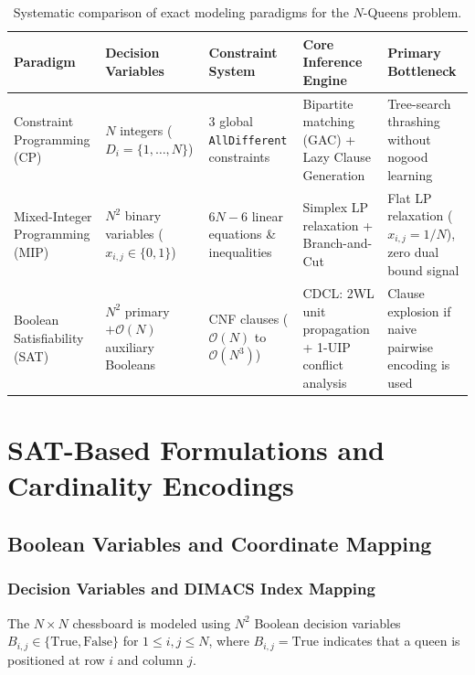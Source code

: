 \documentclass[a4paper,fleqn]{cas-sc}
\begin{document}
\begin{table}[ht]
\centering
\caption{Systematic comparison of exact modeling paradigms for the $N$-Queens problem.}
\label{tab:paradigm_comparison}
\begin{tabularx}{\linewidth}{lXXXX}
\toprule
\textbf{Paradigm} & \textbf{Decision Variables} & \textbf{Constraint System} & \textbf{Core Inference Engine} & \textbf{Primary Bottleneck} \\
\midrule
Constraint Programming (CP) & $N$ integers ($D_i = \{1, \dots, N\}$) & 3 global \texttt{AllDifferent} constraints & Bipartite matching (GAC) + Lazy Clause Generation & Tree-search thrashing without nogood learning \\
Mixed-Integer Programming (MIP) & $N^2$ binary variables ($x_{i,j} \in \{0, 1\}$) & $6N - 6$ linear equations \& inequalities & Simplex LP relaxation + Branch-and-Cut & Flat LP relaxation ($x_{i,j} = 1/N$), zero dual bound signal \\
Boolean Satisfiability (SAT) & $N^2$ primary $+ \mathcal{O}(N)$ auxiliary Booleans & CNF clauses ($\mathcal{O}(N)$ to $\mathcal{O}(N^3)$) & CDCL: 2WL unit propagation + 1-UIP conflict analysis & Clause explosion if naive pairwise encoding is used \\
\bottomrule
\end{tabularx}
\end{table}

\section{SAT-Based Formulations and Cardinality Encodings}
\label{sec:sat_encodings}

\subsection{Boolean Variables and Coordinate Mapping}
\label{subsec:sat_decomposition}

\subsubsection{Decision Variables and DIMACS Index Mapping}
The $N \times N$ chessboard is modeled using $N^2$ Boolean decision variables $B_{i,j} \in \{\text{True}, \text{False}\}$ for $1 \le i, j \le N$, where $B_{i,j} = \text{True}$ indicates that a queen is positioned at row $i$ and column $j$.
\end{document}
